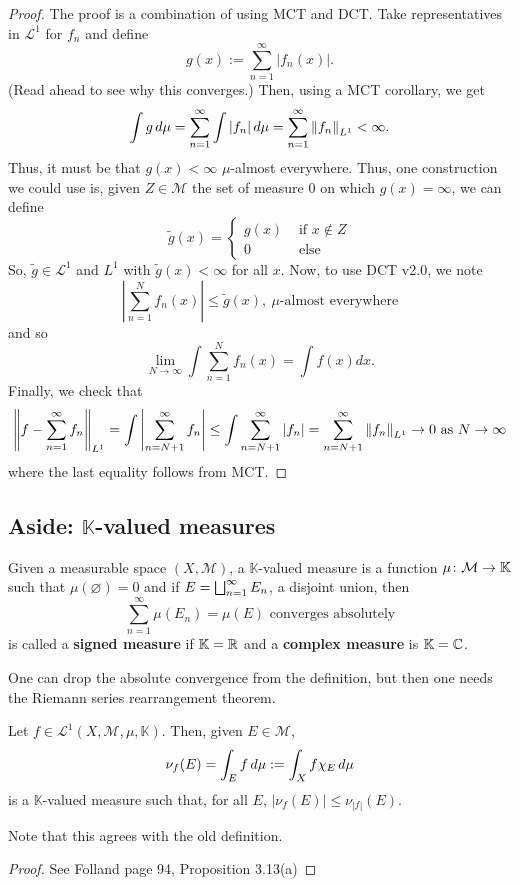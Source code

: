 \documentclass[11pt,leqno,oneside]{amsbook}
\numberwithin{thm}{section}
\newcommand{\M}{\mathcal{M}} %
\newcommand{\cL}{\mathcal{L}}
\newcommand{\K}{\mathbb{K}} %
\renewcommand{\emptyset}{\varnothing}
\renewcommand{\de}{\textbf} %
\begin{document}
\begin{proof}
  The proof is a combination of using MCT and DCT. Take representatives
  in \(\cL^1\) for \(f_n\) and define \[
    g(x) := \sum_{n=1}^\infty |f_n(x)|.
  \]
  (Read ahead to see why this converges.) Then, using a MCT corollary, we
  get \[
    \int g \d\mu = \sum_{n=1}^\infty \int |f_n| \d\mu = \sum_{n=1}^\infty \norm[f_n]_{L^1} < \infty.
  \]
  Thus, it must be that \(g(x) < \infty\) \(\mu\)-almost everywhere.
  Thus, one construction we could use is, given \(Z \in \M\) the set
  of measure 0 on which \(g(x) = \infty\), we can define \[
    \tilde{g}(x) =
    \begin{cases}
      g(x) & \text{ if } x \not\in Z \\
      0 & \text{ else }
    \end{cases}
  \]
  So, \(\tilde{g} \in \cL^1\) and \(L^1\) with \(\tilde{g}(x) <
  \infty\) for all \(x\). Now, to use DCT v2.0, we note \[
    \left| \sum_{n=1}^N f_n(x) \right| \leq \tilde{g}(x), \
    \mu\text{-almost everywhere}
  \]
  and so \[
    \lim_{N \to \infty} \int \sum_{n=1}^N f_n(x) = \int f(x) dx.
  \]
  Finally, we check that \[
    \norm[f - \sum_{n=1}^\infty f_n]_{L^1} = \int \left|
      \sum_{n=N+1}^\infty f_n \right| \leq \int \sum_{n=N+1}^\infty
    |f_n| = \sum_{n=N+1}^\infty \norm[f_n]_{L^1} \to 0 \text{ as } N
    \to \infty
  \]
  where the last equality follows from MCT.
\end{proof}
\subsection{Aside: \(\K\)-valued measures}
\begin{defn}
  Given a measurable space \((X,\M)\), a \(\K\)-valued measure is a
  function \(\mu \from \M \to \K\) such that \(\mu(\emptyset) = 0\)
  and if \(E = \Dunion_{n=1}^\infty E_n\), a disjoint union, then \[
    \sum_{n=1}^\infty \mu(E_n) = \mu(E) \text{ converges absolutely}
  \]
  is called a \de{signed measure} if \(\K=\R\) and a \de{complex
    measure} is \(\K=\C\).
\end{defn}
\begin{rmk}
  One can drop the absolute convergence from the definition, but then
  one needs the Riemann series rearrangement theorem.
\end{rmk}
\begin{prop}
  Let \(f \in \cL^1(X,\M,\mu,\K)\). Then, given \(E \in \M\), \[
    \nu_f(E) = \int_E f \d\mu := \int_X f \chi_E \d\mu
  \]
  is a \(\K\)-valued measure such that, for all \(E\), \(|\nu_f(E)|
  \leq \nu_{|f|}(E)\).
\end{prop}
Note that this agrees with the old definition.
\begin{proof}
  See Folland page 94, Proposition 3.13(a)
\end{proof}
\end{document}

